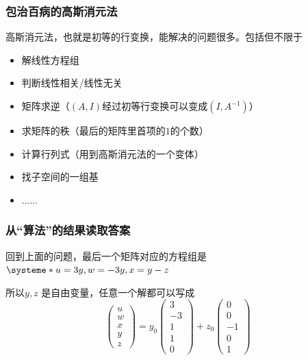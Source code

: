 \documentclass[CJK]{beamer}
\begin{document}
\begin{frame}
\frametitle{包治百病的高斯消元法}
高斯消元法，也就是初等的行变换，能解决的问题很多。包括但不限于
\begin{itemize}
	\item 解线性方程组
	\item 判断线性相关/线性无关
	\item 矩阵求逆（$(A,I)$经过初等行变换可以变成$(I, A^{-1})$）
	\item 求矩阵的秩（最后的矩阵里首项的$1$的个数）
	\item 计算行列式（用到高斯消元法的一个变体）
	\item 找子空间的一组基
	\item ......
\end{itemize}

\end{frame}

\begin{frame}
\frametitle{从``算法''的结果读取答案}
回到上面的问题，最后一个矩阵对应的方程组是
$
\systeme*{u = 3y , w = -3y, x = y - z}
$

所以$y, z$ 是\alert{自由变量}，任意一个解都可以写成
\[
\begin{pmatrix} u \\ w \\ x \\ y \\ z \end{pmatrix} =  y_0\begin{pmatrix} 3 \\ -3 \\ 1 \\ 1 \\ 0 \end{pmatrix}+ z_0\begin{pmatrix} 0 \\ 0 \\ -1 \\ 0 \\ 1 \end{pmatrix}
\]
	
\end{frame}
\end{document}
